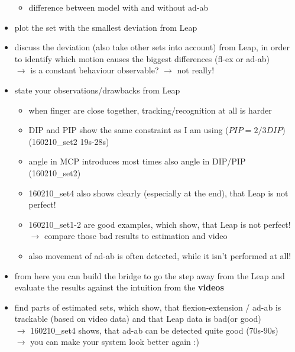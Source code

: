 \begin{itemize}
\begin{itemize}
		\item difference between model with and without ad-ab
		\end{itemize}
	
		
	\item plot the set with the smallest deviation from Leap
	\item discuss the deviation (also take other sets into account) from Leap, in order to identify which motion causes the biggest differences (fl-ex or ad-ab)\\
		$ \rightarrow $ is a constant behaviour observable? $ \rightarrow $ not really!
	\item state your observations/drawbacks from Leap 
				\begin{itemize}
				\item when finger are close together, tracking/recognition at all is harder
				\item DIP and PIP show the same constraint as I am using ($ PIP = 2/3 DIP $) (160210\_set2 19s-28s)
				\item angle in MCP introduces most times also angle in DIP/PIP (160210\_set2) 
				\item 160210\_set4 also shows clearly (especially at the end), that Leap is not perfect!	
				\item 160210\_set1-2 are good examples, which show, that Leap is not perfect!
					$ \rightarrow $	compare those bad results to estimation and video
				\item also movement of ad-ab is often detected, while it isn't performed at all!
				\end{itemize}
				
	\item from here you can build the bridge to go the step away from the Leap and evaluate the results against the intuition from the \textbf{videos}
	\item find parts of estimated sets, which show, that flexion-extension / ad-ab is trackable (based on video data) and that Leap data is bad(or good) \\
		$ \rightarrow $ 160210\_set4 shows, that ad-ab can be detected quite good (70s-90s)	\\
		$ \rightarrow $	you can make your system look better again :)  
	\end{itemize}
	
